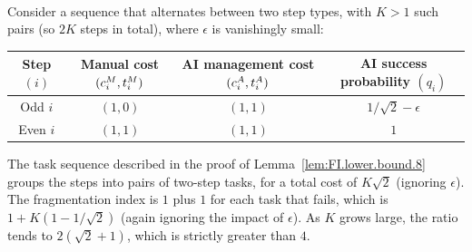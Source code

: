 \documentclass[12pt, final]{article}
\begin{document}
\\[-0.2em]
\noindent{\color{black!25}\rule{\linewidth}{0.4pt}}\par\vspace{1em}
\renewcommand\theexample{OA.B.\arabic{example}}
\setcounter{example}{2}
\begin{example}
\label{ex:FI.necessity}
Consider a sequence that alternates between two step types, with $K > 1$ such pairs (so $2K$ steps in total), where $\epsilon$ is vanishingly small:
\begin{center}
\begin{tabular}{c|ccc}
\toprule
\makecell{Step\\$(i)$} & \makecell{Manual cost\\$(c^{M}_{i}, t^{M}_{i})$} & \makecell{AI management cost\\$(c^{A}_{i}, t^{A}_{i})$} & \makecell{AI success probability\\$(q_i)$} \\
\midrule
Odd $i$ & $(1, 0)$ & $(1, 1)$ & $1/\sqrt{2}-\epsilon$ \\
Even $i$ & $(1, 1)$ & $(1, 1)$ & $1$ \\
\bottomrule
\end{tabular}
\end{center}
The task sequence described in the proof of Lemma~\ref{lem:FI.lower.bound.8} groups the steps into pairs of two-step tasks, for a total cost of $K \sqrt{2}$ (ignoring $\epsilon$).
The fragmentation index is $1$ plus $1$ for each task that fails, which is $1 + K(1 - 1/\sqrt{2})$ (again ignoring the impact of $\epsilon$).
As $K$ grows large, the ratio tends to $2(\sqrt{2}+1)$, which is strictly greater than $4$.
\end{example}
\clearpage
\end{document}
